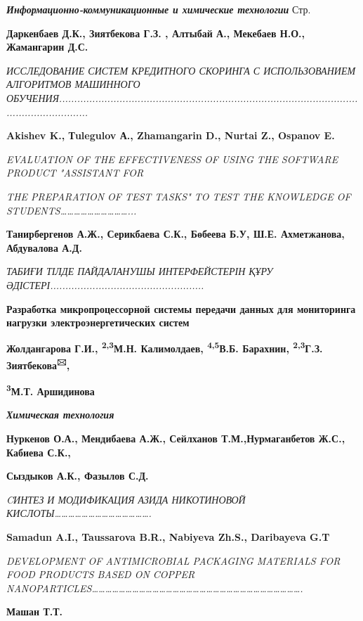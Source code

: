 \emph{{\bfseries Информационно-коммуникационные и химические технологии}}
Стр.

{\bfseries Даркенбаев Д.К., Зиятбекова Г.З. , Алтыбай А., Мекебаев Н.О.,
Жамангарин Д.С.}

\emph{ИССЛЕДОВАНИЕ СИСТЕМ КРЕДИТНОГО СКОРИНГА С ИСПОЛЬЗОВАНИЕМ
АЛГОРИТМОВ МАШИННОГО
ОБУЧЕНИЯ..............................................................................................................................}

{\bfseries Akishev K., Тulegulov А., Zhamangarin D., Nurtai Z., Ospanov E.}

\emph{EVALUATION OF THE EFFECTIVENESS OF USING THE SOFTWARE PRODUCT
"ASSISTANT FOR}

\emph{THE PREPARATION OF TEST TASKS" TO TEST THE KNOWLEDGE OF
STUDENTS\ldots\ldots\ldots\ldots\ldots\ldots\ldots\ldots\ldots\ldots...}

{\bfseries Танирбергенов А.Ж., Серикбаева С.К., Бөбеева Б.У, Ш.Е.
Ахметжанова, Абдувалова А.Д.}

\emph{ТАБИҒИ ТІЛДЕ ПАЙДАЛАНУШЫ ИНТЕРФЕЙСТЕРІН ҚҰРУ
ӘДІСТЕРІ...................................................}

{\bfseries Разработка микропроцессорной системы передачи данных для
мониторинга нагрузки электроэнергетических систем}

{\bfseries Жолдангарова Г.И., \textsuperscript{2,3}М.Н. Калимолдаев,
\textsuperscript{4,5}В.Б. Барахнин, \textsuperscript{2,3}Г.З.
Зиятбекова\textsuperscript{🖂},}

{\bfseries \textsuperscript{3}М.Т. Аршидинова}

\emph{{\bfseries Химическая технология}}

{\bfseries Нуркенов О.А., Мендибаева А.Ж., Сейлханов Т.М.,Нурмаганбетов
Ж.С., Кабиева С.К.,}

{\bfseries Сыздыков А.К., Фазылов С.Д.}

\emph{CИНТЕЗ И МОДИФИКАЦИЯ АЗИДА НИКОТИНОВОЙ
КИСЛОТЫ\ldots\ldots\ldots\ldots\ldots\ldots\ldots\ldots\ldots\ldots\ldots\ldots\ldots\ldots.}

{\bfseries Samadun A.I., Taussarova B.R., Nabiyeva Zh.S., Daribayeva G.T}

\emph{DEVELOPMENT OF ANTIMICROBIAL PACKAGING MATERIALS FOR FOOD PRODUCTS
BASED ON COPPER
NANOPARTICLES\ldots\ldots\ldots\ldots\ldots\ldots\ldots\ldots\ldots\ldots\ldots\ldots\ldots\ldots\ldots\ldots\ldots\ldots\ldots\ldots\ldots\ldots\ldots\ldots\ldots\ldots\ldots\ldots\ldots\ldots\ldots.}

{\bfseries Машан Т.Т.}

